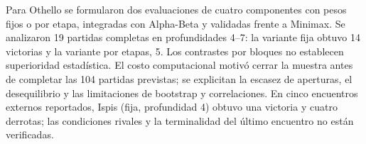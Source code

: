 Para Othello se formularon dos evaluaciones de cuatro componentes con pesos fijos o por etapa, integradas con Alpha-Beta y validadas frente a Minimax. Se analizaron 19 partidas completas en profundidades 4--7: la variante fija obtuvo 14 victorias y la variante por etapas, 5. Los contrastes por bloques no establecen superioridad estadística. El costo computacional motivó cerrar la muestra antes de completar las 104 partidas previstas; se explicitan la escasez de aperturas, el desequilibrio y las limitaciones de bootstrap y correlaciones. En cinco encuentros externos reportados, Ispis (fija, profundidad 4) obtuvo una victoria y cuatro derrotas; las condiciones rivales y la terminalidad del último encuentro no están verificadas.
